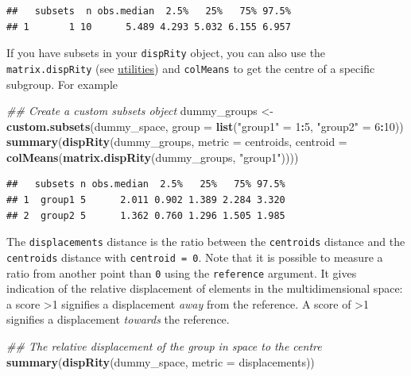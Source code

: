 \documentclass[]{book}
\newenvironment{Shaded}{\begin{snugshade}}{\end{snugshade}}
\newcommand{\CommentTok}[1]{\textcolor[rgb]{0.56,0.35,0.01}{\textit{#1}}}
\newcommand{\DataTypeTok}[1]{\textcolor[rgb]{0.13,0.29,0.53}{#1}}
\newcommand{\DecValTok}[1]{\textcolor[rgb]{0.00,0.00,0.81}{#1}}
\newcommand{\KeywordTok}[1]{\textcolor[rgb]{0.13,0.29,0.53}{\textbf{#1}}}
\newcommand{\NormalTok}[1]{#1}
\newcommand{\OperatorTok}[1]{\textcolor[rgb]{0.81,0.36,0.00}{\textbf{#1}}}
\newcommand{\StringTok}[1]{\textcolor[rgb]{0.31,0.60,0.02}{#1}}
\begin{document}
\begin{verbatim}
##   subsets  n obs.median  2.5%   25%   75% 97.5%
## 1       1 10      5.489 4.293 5.032 6.155 6.957
\end{verbatim}

If you have subsets in your \texttt{dispRity} object, you can also use the \texttt{matrix.dispRity} (see \protect\hyperlink{utilities}{utilities}) and \texttt{colMeans} to get the centre of a specific subgroup.
For example

\begin{Shaded}
\begin{Highlighting}[]
\CommentTok{## Create a custom subsets object}
\NormalTok{dummy_groups <-}\StringTok{ }\KeywordTok{custom.subsets}\NormalTok{(dummy_space,}
                               \DataTypeTok{group =} \KeywordTok{list}\NormalTok{(}\StringTok{"group1"}\NormalTok{ =}\StringTok{ }\DecValTok{1}\OperatorTok{:}\DecValTok{5}\NormalTok{,}
                                            \StringTok{"group2"}\NormalTok{ =}\StringTok{ }\DecValTok{6}\OperatorTok{:}\DecValTok{10}\NormalTok{))}
\KeywordTok{summary}\NormalTok{(}\KeywordTok{dispRity}\NormalTok{(dummy_groups, }\DataTypeTok{metric =}\NormalTok{ centroids,}
    \DataTypeTok{centroid =} \KeywordTok{colMeans}\NormalTok{(}\KeywordTok{matrix.dispRity}\NormalTok{(dummy_groups, }\StringTok{"group1"}\NormalTok{))))}
\end{Highlighting}
\end{Shaded}

\begin{verbatim}
##   subsets n obs.median  2.5%   25%   75% 97.5%
## 1  group1 5      2.011 0.902 1.389 2.284 3.320
## 2  group2 5      1.362 0.760 1.296 1.505 1.985
\end{verbatim}

The \texttt{displacements} distance is the ratio between the \texttt{centroids} distance and the \texttt{centroids} distance with \texttt{centroid\ =\ 0}.
Note that it is possible to measure a ratio from another point than \texttt{0} using the \texttt{reference} argument.
It gives indication of the relative displacement of elements in the multidimensional space: a score \textgreater{}1 signifies a displacement \emph{away} from the reference. A score of \textgreater{}1 signifies a displacement \emph{towards} the reference.

\begin{Shaded}
\begin{Highlighting}[]
\CommentTok{## The relative displacement of the group in space to the centre}
\KeywordTok{summary}\NormalTok{(}\KeywordTok{dispRity}\NormalTok{(dummy_space, }\DataTypeTok{metric =}\NormalTok{ displacements))}
\end{Highlighting}
\end{Shaded}
\end{document}
